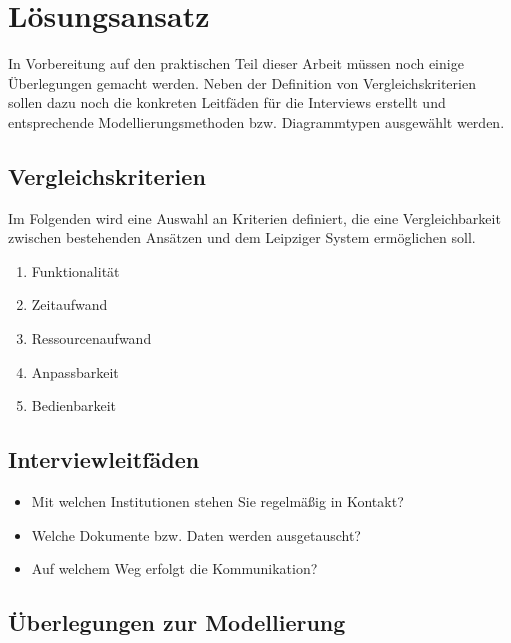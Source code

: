 \chapter{Lösungsansatz}\label{ch:approach}

In Vorbereitung auf den praktischen Teil dieser Arbeit müssen noch einige Überlegungen gemacht werden. Neben der Definition von Vergleichskriterien sollen dazu noch die konkreten Leitfäden für die Interviews erstellt und entsprechende Modellierungsmethoden bzw. Diagrammtypen ausgewählt werden.

\section{Vergleichskriterien}

Im Folgenden wird eine Auswahl an Kriterien definiert, die eine Vergleichbarkeit zwischen bestehenden Ansätzen und dem Leipziger System ermöglichen soll.

\begin{enumerate}
	\item Funktionalität
	\item Zeitaufwand
	\item Ressourcenaufwand
	\item Anpassbarkeit
	\item Bedienbarkeit
\end{enumerate}


\section{Interviewleitfäden}

\begin{itemize}
	\item Mit welchen Institutionen stehen Sie regelmäßig in Kontakt?
	\item Welche Dokumente bzw. Daten werden ausgetauscht?
	\item Auf welchem Weg erfolgt die Kommunikation?
\end{itemize}

\section{Überlegungen zur Modellierung}

